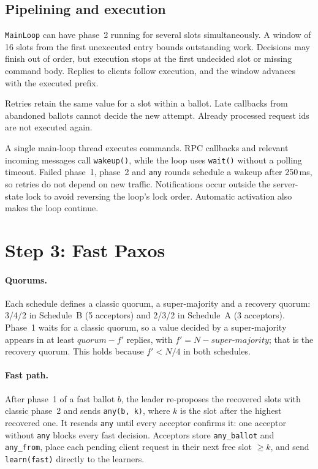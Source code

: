 \documentclass[times,10pt,twocolumn]{article}
\newcommand{\code}[1]{\texttt{\small #1}}
\begin{document}
\subsection{Pipelining and execution}
\code{MainLoop} can have phase~2 running for several slots simultaneously.
A window of 16 slots from the first unexecuted entry bounds outstanding work.
Decisions may finish out of order, but execution stops at the first undecided
slot or missing command body. Replies to clients follow execution, and the
window advances with the executed prefix.

Retries retain the same value for a slot within a ballot. Late callbacks from
abandoned ballots cannot decide the new attempt. Already processed request
ids are not executed again.

A single main-loop thread executes commands. RPC callbacks and relevant
incoming messages call \code{wakeup()}, while the loop uses \code{wait()}
without a polling timeout. Failed phase~1, phase~2 and \code{any} rounds
schedule a wakeup after 250\,ms, so retries do not depend on new traffic.
Notifications occur outside the server-state lock to avoid reversing the
loop's lock order. Automatic activation also makes the loop continue.

\section{Step 3: Fast Paxos}
\label{sec:step3}

\paragraph{Quorums.} Each schedule defines a classic quorum, a
super-majority and a recovery quorum: 3/4/2 in Schedule~B (5 acceptors)
and 2/3/2 in Schedule~A (3 acceptors). Phase~1 waits for a classic
quorum, so a value decided by a super-majority appears in at least
$\textit{quorum} - f'$ replies, with $f' = N - \textit{super-majority}$;
that is the recovery quorum. This holds because $f' < N/4$ in both
schedules.

\paragraph{Fast path.} After phase~1 of a fast ballot $b$, the leader
re-proposes the recovered slots with classic phase~2 and sends
\code{any(b, k)}, where $k$ is the slot after the highest recovered one.
It resends \code{any} until every acceptor confirms it: one acceptor
without \code{any} blocks every fast decision. Acceptors store
\code{any\_ballot} and \code{any\_from}, place each pending client
request in their next free slot $\geq k$, and send \code{learn(fast)}
directly to the learners.
\end{document}
